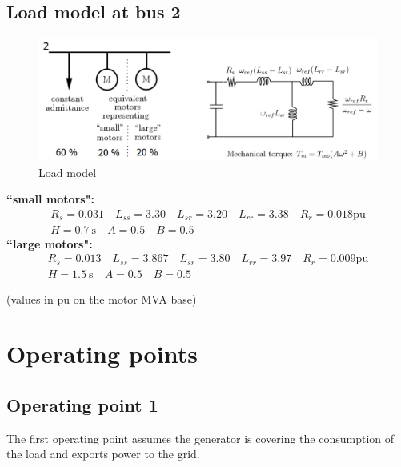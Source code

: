 \documentclass[a4paper,11pt,oneside,onecolumn]{article}
\begin{document}
\subsection{Load model at bus 2}

\begin{figure}[H]
	\centering
	\includegraphics[width=1\linewidth]{load}
	\caption{Load model}
	\label{fig:load}
\end{figure}

\textbf{``small motors":}
$$
\begin{gathered}
	R_s=0.031 \quad L_{s s}=3.30 \quad L_{s r}=3.20 \quad L_{r r}=3.38 \quad R_r=0.018 \mathrm{pu} \\
	H=0.7 \mathrm{~s} \quad A=0.5 \quad B=0.5
\end{gathered}
$$
\textbf{``large motors":}
$$
\begin{gathered}
	R_s=0.013 \quad L_{s s}=3.867 \quad L_{s r}=3.80 \quad L_{r r}=3.97 \quad R_r=0.009 \mathrm{pu} \\
	H=1.5 \mathrm{~s} \quad A=0.5 \quad B=0.5
\end{gathered}
$$

(values in pu on the motor MVA base)

\section{Operating points}

\subsection{Operating point 1}

The first operating point assumes the generator is covering the consumption of the load and exports power to the grid.
\end{document}
